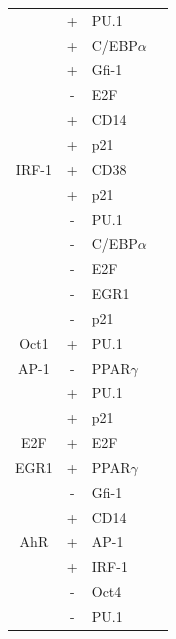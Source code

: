 \documentclass[12pt]{article}
\begin{document}
\begin{center}
\begin{scriptsize}
\begin{supertabular}{c|c|l|l}
 &  + & PU.1 & \cite{Dahl2003}\\
 &  + & C/EBP$\alpha$ & \cite{Timchenko1995}\\
 &  + & Gfi-1 & \cite{Lidonnici2010}\\
 &  - & E2F & \cite{DAlo2003}\\
 &  + & CD14 & \cite{Pan1999}\\
 &  + & p21 & \cite{Harris2001}\\
\hline
IRF-1 &  + & CD38 & \cite{Bauvois1999}\\
 &  + & p21 & \cite{Passioura2005}\\
 &  - & PU.1 & \cite{Dahl2007}\\
 &  - & C/EBP$\alpha$ & \cite{Duan2003}\\
 &  - & E2F & \cite{Duan2003}\\
 &  - & EGR1 & \cite{Laslo2006}\\
 &  - & p21 & \cite{Duan2003}\\
\hline
Oct1 &  + & PU.1 & \cite{Chen1996}\\
\hline
AP-1 &  - & PPAR$\gamma$  & \cite{Delerive1999}\\
&  + & PU.1 &  \cite{Behre1999}\\
&  + & p21 &  \cite{Kardassis1999}\\
\hline
E2F &  + & E2F & \cite{Johnson1994}\\
\hline
EGR1 &  + & PPAR$\gamma$ & \cite{Fu2002}\\
&  - & Gfi-1 & \cite{Mak2011}\\
&  + & CD14 & \cite{Chen2004}\\
\hline
AhR &  + & AP-1 & \cite{Suh2002}\\
&  + & IRF-1 & \cite{Shen2011}\\
& - & Oct4 & \cite{Bunaciu2011}\\
& - & PU.1 & \\

\hline
\end{supertabular}
\end{scriptsize}
\end{center}

\clearpage
\end{document}
